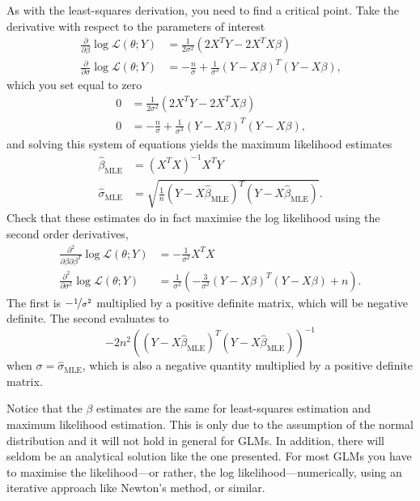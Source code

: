 \documentclass[a4paper]{article}
\begin{document}
As with the least-squares derivation, you need to find a critical point.
Take the derivative with respect to the parameters of interest
\begin{align*}
 \frac{\partial}{\partial\beta}
\log\mathcal{L}(\theta;Y)
 &=
  \frac{1}{2 \sigma^2}
(  2 X^T Y -
    2X^T X \beta )
    \\
 \frac{\partial}{\partial\sigma}
\log\mathcal{L}(\theta;Y)
 &=
-\frac{n}{\sigma}
+  \frac{1}{\sigma^3}
   (Y-X\beta)^T (Y-X\beta)
   \text{,}
\end{align*}
which you set equal to zero
\begin{align*}
0
 &=
  \frac{1}{2 \sigma^2}
(  2 X^T Y -
    2X^T X \beta )
    \\
0
 &=
-\frac{n}{\sigma}
+  \frac{1}{\sigma^3}
   (Y-X\beta)^T (Y-X\beta)
   \text{,}
\end{align*}
and solving this system of equations yields the maximum likelihood estimates
\begin{align*}
\hat{\beta}_{\text{MLE}} &= (X^T X)^{-1} X^T Y
    \\
\hat{\sigma}_{\text{MLE}}
 &=
\sqrt{
\frac{1}{n}
   (Y-X\hat{\beta}_{\text{MLE}})^T (Y-X\hat{\beta}_{\text{MLE}})
   }
   \text{.}
\end{align*}
Check that these estimates do in fact maximise the log likelihood using the second order derivatives,
\begin{align*}
 \frac{\partial^2}{\partial\beta \partial\beta^T}
 \log\mathcal{L}(\theta;Y)
 &=
 - \frac{1}{ \sigma^2} X^T X
 \\
 \frac{\partial^2}{\partial\sigma^2}
\log\mathcal{L}(\theta;Y)
 &=
\frac{1}{\sigma^2}
\left(
 -\frac{3}{\sigma^2}
   (Y-X\beta)^T (Y-X\beta)
   + n
\right)
   \text{.}
\end{align*}
The first is
$ -\nicefrac{1}{ \sigma^2}$ multiplied by a positive definite matrix, which will be negative definite.
The second evaluates to
\[
-2n^2
\left(
  (Y-X\hat{\beta}_{\text{MLE}})^T
  (Y-X\hat{\beta}_{\text{MLE}})
\right)^{-1}
\]
when $\sigma = \hat{\sigma}_{\text{MLE}}$, which is also a negative quantity multiplied by a positive definite matrix.


Notice that the $\beta$ estimates are the same for least-squares estimation and maximum likelihood estimation.
This is only due to the assumption of the normal distribution and it will not hold in general for GLMs.
In addition, there will seldom be an analytical solution like the one presented.
For most GLMs you have to maximise the likelihood---or rather, the log likelihood---numerically, using an iterative approach like Newton's method, or similar.
\end{document}
